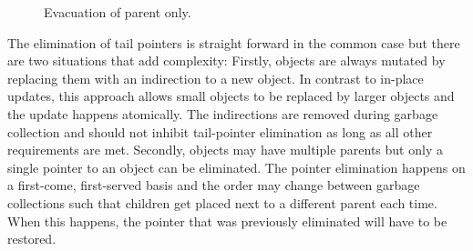 \documentclass[a4paper,oneside]{memoir}
\begin{document}
\begin{figure}[b]
  
  \caption{Evacuation of parent only.}
  \label{multiple_parents}
\end{figure}


The elimination of tail pointers is straight forward in the common case but there
are two situations that add complexity: Firstly, objects are always mutated by
replacing them with an indirection to a new object. In contrast to in-place updates,
this approach allows small objects to be replaced by larger objects and the update
happens atomically. The indirections are removed during garbage collection
and should not inhibit tail-pointer elimination as long as all other requirements
are met.
Secondly, objects may have multiple parents but only a single pointer to an object
can be eliminated. The pointer elimination happens on a first-come, first-served
basis and the order may change between garbage collections such that children get
placed next to a different parent each time. When this happens, the pointer
that was previously eliminated will have to be restored.
\end{document}
